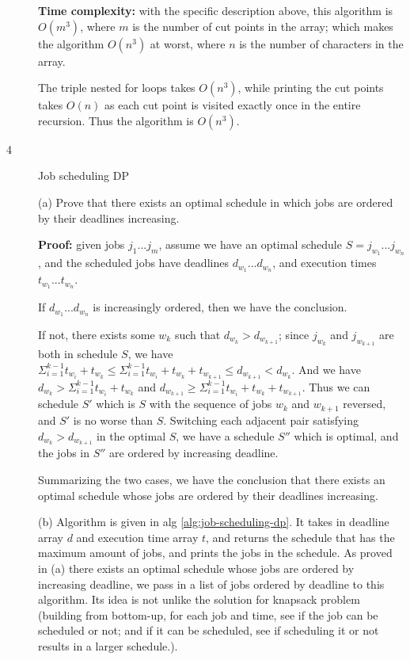 \documentclass{article}
\begin{document}
\begin{description}
  \textbf{Time complexity:} with the specific description above, this algorithm is $O(m^3)$, where $m$ is the number of cut points in the array; which makes the algorithm $O(n^3)$ at worst, where $n$ is the number of characters in the array.

  The triple nested for loops takes $O(n^3)$, while printing the cut points takes $O(n)$ as each cut point is visited exactly once in the entire recursion. Thus the algorithm is $O(n^3)$.

\item[4]{Job scheduling DP}

  (a) Prove that there exists an optimal schedule in which jobs are ordered by their deadlines increasing.

  \textbf{Proof:} given jobs $j_1...j_m$, assume we have an optimal schedule $S = j_{w_1}...j_{w_n}$, and the scheduled jobs have deadlines $d_{w_1}...d_{w_n}$, and execution times $t_{w_1}...t_{w_n}$. 

  If $d_{w_1}...d_{w_n}$ is increasingly ordered, then we have the conclusion.  

  If not, there exists some $w_k$ such that $d_{w_k} > d_{w_{k+1}}$; since $j_{w_k}$ and $j_{w_{k+1}}$ are both in schedule $S$, we have $\Sigma_{i=1}^{k-1}{t_{w_i}} + t_{w_k} \leq \Sigma_{i=1}^{k-1}{t_{w_i}} + t_{w_k} + t_{w_{k+1}} \leq d_{w_{k+1}} < d_{w_k}$. And we have $d_{w_k} > \Sigma_{i=1}^{k-1}{t_{w_i}} + t_{w_k}$ and $d_{w_{k+1}} \geq \Sigma_{i=1}^{k-1}{t_{w_i}} + t_{w_k} + t_{w_{k+1}}$. Thus we can schedule $S'$ which is $S$ with the sequence of jobs $w_k$ and $w_{k+1}$ reversed, and $S'$ is no worse than $S$. Switching each adjacent pair satisfying $d_{w_k} > d_{w_{k+1}}$ in the optimal $S$, we have a schedule $S''$ which is optimal, and the jobs in $S''$ are ordered by increasing deadline.

  Summarizing the two cases, we have the conclusion that there exists an optimal schedule whose jobs are ordered by their deadlines increasing.

  (b) Algorithm is given in alg \ref{alg:job-scheduling-dp}. It takes in deadline array $d$ and execution time array $t$, and returns the schedule that has the maximum amount of jobs, and prints the jobs in the schedule. As proved in (a) there exists an optimal schedule whose jobs are ordered by increasing deadline, we pass in a list of jobs ordered by deadline to this algorithm. Its idea is not unlike the solution for knapsack problem (building from bottom-up, for each job and time, see if the job can be scheduled or not; and if it can be scheduled, see if scheduling it or not results in a larger schedule.).


\end{description}
\end{document}
